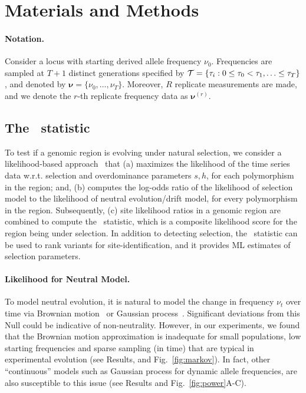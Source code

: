 \section{Materials and Methods}
\label{sec:method}
\paragraph{Notation.} 
Consider a locus with starting derived allele frequency
$\nu_0$. Frequencies are sampled at $T+1$ distinct generations specified
by ${\cal T}= \{\tau_i: 0\le \tau_0<\tau_1,\ldots\le \tau_T\}$, and
denoted by $\bm{\nu}=\{\nu_0,\ldots,\nu_T\}$. Moreover, $R$ replicate
measurements are made, and we denote the $r$-th replicate frequency
data as $\bm{\nu}^{(r)}$.

\subsection{The \comale\  statistic}
To test if a genomic region is evolving under natural selection, we
consider a likelihood-based
approach~\cite{vitti2013detecting,nielsen2005genomic,topa2015gaussian,Terhorst2015Multi}
that (a) maximizes the likelihood of the time series data
w.r.t. selection and overdominance parameters $s,h$, for each
polymorphism in the region; and, (b) computes the log-odds ratio of
the likelihood of selection model to the likelihood of neutral
evolution/drift model, for every polymorphism in the
region. Subsequently, (c) site likelihood ratios in a genomic region
are combined to compute the \comale\ statistic, which is a composite
likelihood score for the region being under selection. In addition to
detecting selection, the \comale\ statistic can be used to rank
variants for site-identification, and it provides ML estimates of
selection parameters.

\paragraph{Likelihood for Neutral Model.}
To model neutral evolution, it is natural to model the change in
frequency $\nu_t$ over time via Brownian
motion~\cite{feder2014Identifying} or Gaussian
process~\cite{topa2015gaussian,Terhorst2015Multi}. Significant
deviations from this Null could be indicative of
non-neutrality. However, in our experiments, we found that the
Brownian motion approximation is inadequate for small populations, low
starting frequencies and sparse sampling (in time) that are typical in
experimental evolution (see Results, and Fig.~\ref{fig:markov}). In
fact, other ``continuous'' models such as Gaussian process for dynamic
allele frequencies, are also susceptible to this issue (see Results
and Fig.~\ref{fig:power}A-C).


